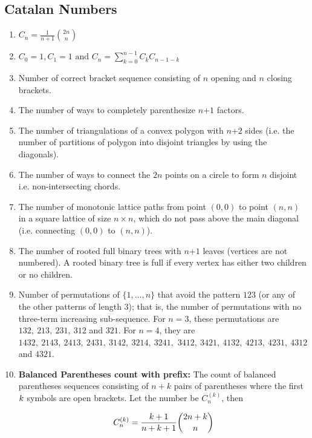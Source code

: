\subsection{Catalan Numbers}
\begin{enumerate}
\item $\displaystyle C_n=\frac{1}{n+1}{\binom{2n}{n}}$
\item $\displaystyle C_0=1,C_1=1\text{ and }C_n=\sum \limits_{k=0}^{n-1}C_k C_{n-1-k}$
\item Number of correct bracket sequence consisting of $n$ opening and $n$ closing brackets.
\item The number of ways to completely parenthesize $n$+$\displaystyle 1$ factors.
\item The number of triangulations of a convex polygon with  $n$+$\displaystyle 2$ sides (i.e. the number of partitions of polygon into disjoint triangles by using the diagonals).
\item The number of ways to connect the $\displaystyle 2n$ points on a circle to form $n$ disjoint i.e. non-intersecting  chords.
\item The number of monotonic lattice paths from point $\displaystyle (0,0)$ to point $\displaystyle (n,n)$ in a square lattice of size $n\times n$, which do not pass above the main diagonal (i.e. connecting $\displaystyle (0,0)$ to $\displaystyle (n,n)$).
\item The number of rooted full binary trees with $n$+$\displaystyle 1$ leaves (vertices are not numbered). A rooted binary tree is full if every vertex has either two children or no children.
\item Number of permutations of $\displaystyle \{1, \ldots, n\}$ that avoid the pattern $\displaystyle 123$ (or any of the other patterns of length $3$); that is, the number of permutations with no three-term increasing sub-sequence. For $n = 3$, these permutations are $\displaystyle 132,\ 213,\ 231,\ 312$ and $321.$ For $n = 4$, they are $\displaystyle 1432,\ 2143,\ 2413,\ 2431,\ 3142,\ 3214,\ 3241,$ $3412,\ 3421,\ 4132,\ 4213,\ 4231,\ 4312$ and $4321.$
\item \textbf{Balanced Parentheses count with prefix:}
    The count of balanced parentheses sequences consisting of $n+k$ pairs of parentheses where the first $\displaystyle \displaystyle k$ symbols are open brackets. Let the number be $\displaystyle C_n^{(k)}$, then
    
    $$\displaystyle \displaystyle C_n^{(k)} = \frac{k+1}{n+k+1} \binom{2n+k}{n}$$
\end{enumerate}  

